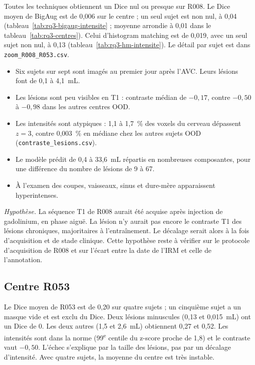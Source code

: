 Toutes les techniques obtiennent un Dice nul ou presque sur R008. Le Dice moyen de BigAug est de 0,006 sur le centre ; un seul sujet est non nul, à 0,04 (tableau~\ref{tab:rq3-bigaug-intensite} ; moyenne arrondie à 0,01 dans le tableau~\ref{tab:rq3-centres}). Celui d'histogram matching est de 0,019, avec un seul sujet non nul, à 0,13 (tableau~\ref{tab:rq3-hm-intensite}). Le détail par sujet est dans \nolinkurl{zoom_R008_R053.csv}.
\begin{itemize}
  \item Six sujets sur sept sont imagés au premier jour après l'AVC. Leurs lésions font de 0,1 à 4,1~mL.
  \item Les lésions sont peu visibles en T1 : contraste médian de $-0{,}17$, contre $-0{,}50$ à $-0{,}98$ dans les autres centres OOD.
  \item Les intensités sont atypiques : 1,1 à 1,7~\% des voxels du cerveau dépassent $z = 3$, contre 0,003~\% en médiane chez les autres sujets OOD (\nolinkurl{contraste_lesions.csv}).
  \item Le modèle prédit de 0,4 à 33,6~mL répartis en nombreuses composantes, pour une différence du nombre de lésions de 9 à 67.
  \item À l'examen des coupes, vaisseaux, sinus et dure-mère apparaissent hyperintenses.
\end{itemize}

\emph{Hypothèse.} La séquence T1 de R008 aurait été acquise après injection de gadolinium, en phase aiguë.
La lésion n'y aurait pas encore le contraste T1 des lésions chroniques, majoritaires à l'entraînement.
Le décalage serait alors à la fois d'acquisition et de stade clinique.
Cette hypothèse reste à vérifier sur le protocole d'acquisition de R008 et sur l'écart entre la date de l'IRM et celle de l'annotation.

\subsection{Centre R053}

Le Dice moyen de R053 est de 0,20 sur quatre sujets ; un cinquième sujet a un masque vide et est exclu du Dice.
Deux lésions minuscules (0,13 et 0,015~mL) ont un Dice de 0. Les deux autres (1,5 et 2,6~mL) obtiennent 0,27 et 0,52.
Les intensités sont dans la norme (99\textsuperscript{e} centile du z-score proche de 1,8) et le contraste vaut $-0{,}50$.
L'échec s'explique par la taille des lésions, pas par un décalage d'intensité. Avec quatre sujets, la moyenne du centre est très instable.

